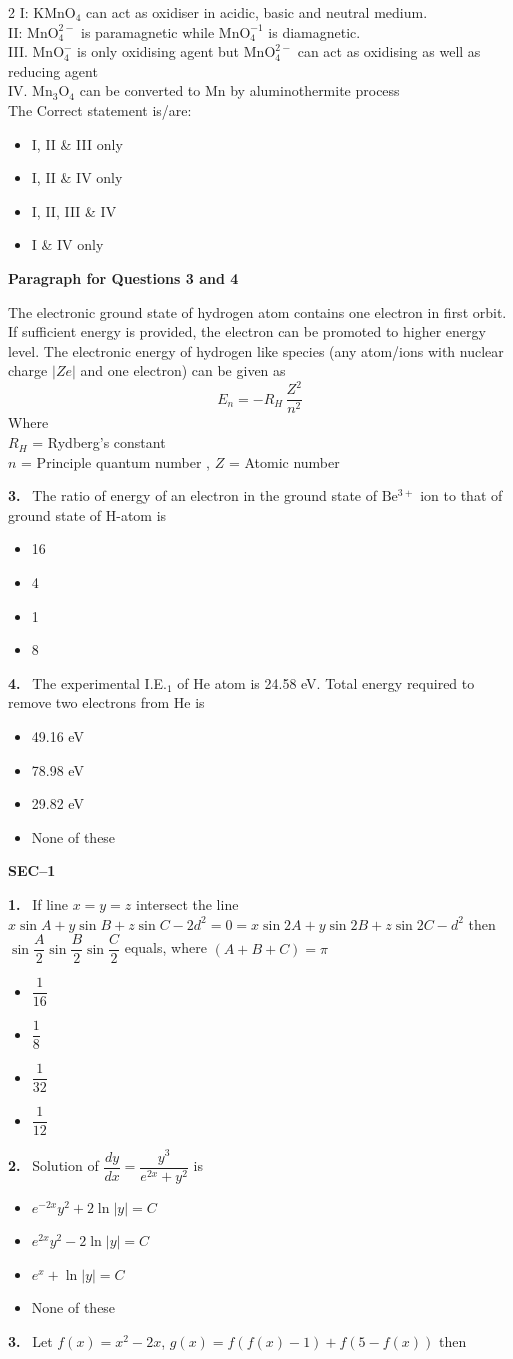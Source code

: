 \documentclass[10pt]{extarticle}
\newcommand{\partsec}[2]{\par\medskip\noindent{\large\bfseries PART-#1: #2}\par\smallskip}
\newcommand{\sect}[1]{\par\smallskip\noindent\textbf{#1}\par}
\newcommand{\qn}[1]{\par\smallskip\noindent\textbf{#1.}~}
\newcommand{\paraq}[2]{\par\smallskip\noindent\textbf{Paragraph for Questions #1 and #2}\par}
\newenvironment{qoptions}{\begin{itemize}[leftmargin=1.8em,itemsep=1pt,topsep=2pt,label={}]}{\end{itemize}}
\newcommand{\opt}[2]{\item[(#1)] #2}
\begin{document}
\begin{multicols}{2}
I: $\mathrm{KMnO_4}$ can act as oxidiser in acidic, basic and neutral medium.\\
II: $\mathrm{MnO_4^{2-}}$ is paramagnetic while $\mathrm{MnO_4^{-1}}$ is diamagnetic.\\
III. $\mathrm{MnO_4^-}$ is only oxidising agent but $\mathrm{MnO_4^{2-}}$ can act as oxidising as well as reducing agent\\
IV. $\mathrm{Mn_3O_4}$ can be converted to Mn by aluminothermite process\\
The Correct statement is/are:
\begin{qoptions}
\opt{A}{I, II \& III only}
\opt{B}{I, II \& IV only}
\opt{C}{I, II, III \& IV}
\opt{D}{I \& IV only}
\end{qoptions}
\paraq{3}{4}
The electronic ground state of hydrogen atom contains one electron in first orbit. If sufficient energy is provided, the electron can be promoted to higher energy level. The electronic energy of hydrogen like species (any atom/ions with nuclear charge $|Ze|$ and one electron) can be given as
\[E_n=-R_H\,\frac{Z^2}{n^2}\]
Where\\
$R_H$ = Rydberg's constant\\
$n$ = Principle quantum number , $Z$ = Atomic number
\qn{3} The ratio of energy of an electron in the ground state of $\mathrm{Be^{3+}}$ ion to that of ground state of H-atom is
\begin{qoptions}
\opt{A}{16}
\opt{B}{4}
\opt{C}{1}
\opt{D}{8}
\end{qoptions}
\qn{4} The experimental I.E.$_1$ of He atom is 24.58 eV. Total energy required to remove two electrons from He is
\begin{qoptions}
\opt{A}{49.16 eV}
\opt{B}{78.98 eV}
\opt{C}{29.82 eV}
\opt{D}{None of these}
\end{qoptions}
\partsec{3}{MATHEMATICS}
\sect{SEC--1}
\qn{1} If line $x=y=z$ intersect the line $x\sin A+y\sin B+z\sin C-2d^2=0=x\sin2A+y\sin2B+z\sin2C-d^2$ then $\sin\dfrac A2\sin\dfrac B2\sin\dfrac C2$ equals, where $(A+B+C)=\pi$
\begin{qoptions}
\opt{A}{$\dfrac1{16}$}
\opt{B}{$\dfrac18$}
\opt{C}{$\dfrac1{32}$}
\opt{D}{$\dfrac1{12}$}
\end{qoptions}
\qn{2} Solution of $\dfrac{dy}{dx}=\dfrac{y^3}{e^{2x}+y^2}$ is
\begin{qoptions}
\opt{A}{$e^{-2x}y^2+2\ln|y|=C$}
\opt{B}{$e^{2x}y^2-2\ln|y|=C$}
\opt{C}{$e^x+\ln|y|=C$}
\opt{D}{None of these}
\end{qoptions}
\qn{3} Let $f(x)=x^2-2x$, $g(x)=f(f(x)-1)+f(5-f(x))$ then

\end{multicols}
\end{document}
